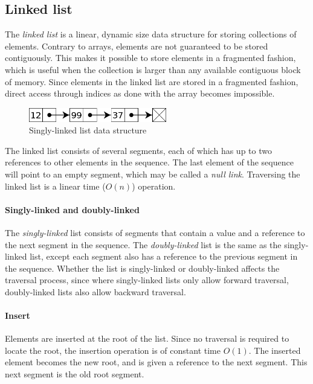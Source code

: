 \documentclass{article}
\begin{document}
\subsection{Linked list}
The {\em linked list} is a linear, dynamic size data structure for storing collections of elements. Contrary to arrays,
elements are not guaranteed to be stored contiguously. This makes it possible to store elements in a fragmented fashion,
which is useful when the collection is larger than any available contiguous block of memory. Since elements in the linked
list are stored in a fragmented fashion, direct access through indices as done with the array becomes impossible.

\begin{figure}[H]
  \centering
  \includegraphics[width=6cm]{linked_list}
  \caption{Singly-linked list data structure}
\end{figure}

The linked list consists of several segments, each of which has up to two references to other
elements in the sequence. The last element of the sequence will point to an empty segment,
which may be called a {\em null link}. Traversing the linked list is a linear time (\(O(n)\)) operation.

\paragraph{Singly-linked and doubly-linked}
The {\em singly-linked} list consists of segments that contain a value and a reference to the next
segment in the sequence. The {\em doubly-linked} list is the same as the singly-linked list,
except each segment also has a reference to the previous segment in the sequence.
Whether the list is singly-linked or doubly-linked affects the traversal process,
since where singly-linked lists only allow forward traversal, doubly-linked lists also allow backward traversal.

\paragraph{Insert}
Elements are inserted at the root of the list. Since no traversal is required to locate the root,
the insertion operation is of constant time \(O(1)\). The inserted element becomes the new root,
and is given a reference to the next segment. This next segment is the old root segment.
\end{document}
